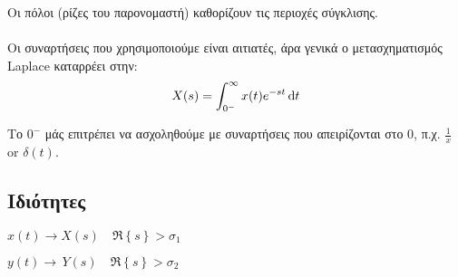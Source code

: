    Οι πόλοι (ρίζες του παρονομαστή) καθορίζουν τις περιοχές σύγκλισης.
    
    \paragraph{}
    Οι συναρτήσεις που χρησιμοποιούμε είναι αιτιατές, άρα γενικά ο μετασχηματισμός
    Laplace καταρρέει στην:
    \[
    X(s) = \int_{0^-}^{\infty} x(t)e^{-st}\dif t
    \]
    
    Το \( 0^- \) μάς επιτρέπει να ασχοληθούμε με συναρτήσεις που απειρίζονται
    στο 0, π.χ. \( \frac{1}{x} \) or \( \delta(t) \).
    
    \subsection{Ιδιότητες}
    \( x(t)\to X(s) \quad \Re\left\lbrace s \right\rbrace > \sigma_1 \)
    
    \( y(t)\to\, Y(s) \quad \Re\left\lbrace s \right\rbrace > \sigma_2 \)
    
